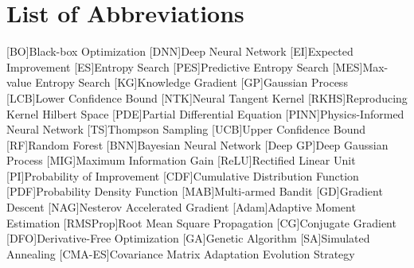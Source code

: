  \noindent


\chapter*{List of Abbreviations}
\begin{multicols}{2}
\begin{acronym}
        [BO]{Black-box Optimization}
        [DNN]{Deep Neural Network}
        [EI]{Expected Improvement}
        [ES]{Entropy Search}
        [PES]{Predictive Entropy Search}
        [MES]{Max-value Entropy Search}
        [KG]{Knowledge Gradient}
        [GP]{Gaussian Process}
        [LCB]{Lower Confidence Bound}
        [NTK]{Neural Tangent Kernel}
        [RKHS]{Reproducing Kernel Hilbert Space}
        [PDE]{Partial Differential Equation}
        [PINN]{Physics-Informed Neural Network}
        [TS]{Thompson Sampling}
        [UCB]{Upper Confidence Bound}
        [RF]{Random Forest}
        [BNN]{Bayesian Neural Network}
        [Deep GP]{Deep Gaussian Process}
        [MIG]{Maximum Information Gain}
        [ReLU]{Rectified Linear Unit}
        [PI]{Probability of Improvement}
        [CDF]{Cumulative Distribution Function}
        [PDF]{Probability Density Function}
        [MAB]{Multi-armed Bandit}
        [GD]{Gradient Descent}
        [NAG]{Nesterov Accelerated Gradient}
        [Adam]{Adaptive Moment Estimation}
        [RMSProp]{Root Mean Square Propagation}
        [CG]{Conjugate Gradient}
        [DFO]{Derivative-Free Optimization}
        [GA]{Genetic Algorithm}
        [SA]{Simulated Annealing}
        [CMA-ES]{Covariance Matrix Adaptation Evolution Strategy}
\end{acronym}
\end{multicols}
